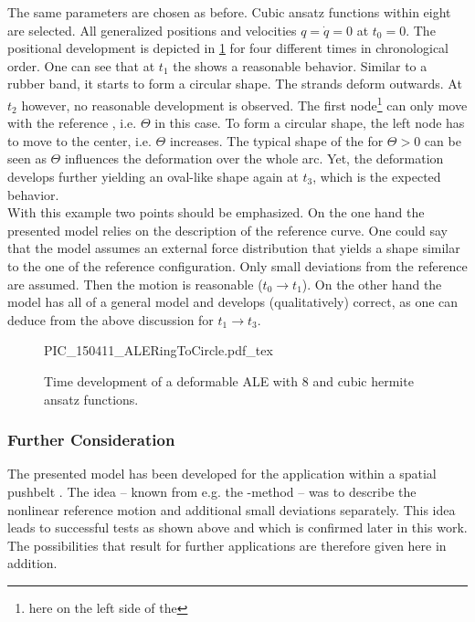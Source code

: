 The same parameters are chosen as before.
Cubic ansatz functions within eight \FEs are selected.
All generalized positions and velocities $q = \dot{q} = 0$ at $t_0=0$.
The positional development is depicted in \cref{fig:PIC_150411_ALERingToCircle} for four different times in chronological order.
One can see that at $t_1$ the \ring shows a reasonable behavior.
Similar to a rubber band, it starts to form a circular shape. 
The strands deform outwards.
At $t_2$ however, no reasonable development is observed.
The first node\footnote{here on the left side of the \ring} can only move with the reference \DOFs, i.e. $\Theta$ in this case.
To form a circular shape, the left node has to move to the center, i.e. $\Theta$ increases.
The typical shape of the \CVT \ring for $\Theta > 0$ can be seen as $\Theta$ influences the deformation over the whole arc.
Yet, the deformation develops further yielding an oval-like shape again at $t_3$, which is the expected behavior.\\
With this example two points should be emphasized.
On the one hand the presented model relies on the description of the reference curve.
One could say that the model assumes an external force distribution that yields a shape similar to the one of the reference configuration.
Only small deviations from the reference are assumed.
Then the motion is reasonable ($t_0 \rightarrow t_1$).
On the other hand the model has all \DOFs of a general model and develops (qualitatively) correct, as one can deduce from the above discussion for $t_1 \rightarrow t_3$.
%
\begin{figure}
  \begin{center}
    {PIC_150411_ALERingToCircle.pdf_tex}
    \caption[Time development of a deformable ALE \ring]{Time development of a deformable ALE \ring with $8$ \FEs and cubic hermite ansatz functions.}
    \label{fig:PIC_150411_ALERingToCircle}
  \end{center}
\end{figure}
%
\subsubsection{Further Consideration}

The presented model has been developed for the application within a spatial pushbelt \CVT.
The idea -- known from e.g. the \FFR-method -- was to describe the nonlinear reference motion and additional small deviations separately.
This idea leads to successful tests as shown above and which is confirmed later in this work.
The possibilities that result for further applications are therefore given here in addition.

